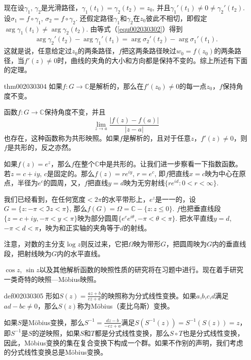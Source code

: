 现在设$\gamma_1$, $\gamma_2$是光滑路径，$\gamma_1(t_1) = \gamma_2(t_2) = z_0$, 并且$\gamma_1'(t_1) \neq 0 \neq \gamma_2'(t_2)$. 设$\sigma_1 = f \circ \gamma_1$, $\sigma_2 = f \circ \gamma_2$. 还假定路径$\gamma_1$和$\gamma_2$在$z_0$彼此不相切，即假定$\arg{\gamma_1(t_1)} \neq \arg{\gamma_2(t_2)}$. 由等式（\ref{equ002030302}）得到
\begin{gather}\label{equ002030303}
\arg{\gamma_2'(t_2)} - \arg{\gamma_1'(t_1)} = \arg{\sigma_2'(t_2)} - \arg{\sigma_1'(t_1)}.
\end{gather}
这就是说，任意给定过$z_0$的两条路径，$f$把这两条路径映过$w_0 = f(z_0)$的两条路径，当$f'(z) \neq 0$时，曲线的夹角的大小和方向都是保持不变的。综上所述有下面的定理。
\begin{theorem}{}{thm002030304}
如果$f:G \to \mathbb{C}$是解析的，那么在$f'(z_0) \neq 0$的每一点$z_0$，$f$保持角度不变。
\end{theorem}

函数$f: G \to \mathbb{C}$保持角度不变，并且
\[
\lim_{z \to a}{\frac{|f(z)-f(a)|}{|z-a|}}
\]
也存在，这种函数称为共形映照。如果$f$是解析的，且对于任意$z$，$f'(z) \neq 0$，则$f$是共形的，反之亦然。

如果$f(z) = e^z$，那么$f$在整个$\mathbb{C}$中是共形的。让我们进一步察看一下指数函数。若$z = c + iy$, $c$是固定的。那么$f(z) = re^{iy}$, $r=e^c$, 即$f$把直线$x=c$映为中心在原点，半径为$e^c$的圆周，又，$f$把直线$y=d$映为无穷射线$\{re^{id}: 0 < r < \infty\}$.

我们已经看到，在任何宽度$<2\pi$的水平带形上，$e^z$是一一的，设$G = \{z:-\pi < \Im{z} < \pi\}$, 那么$f(G) = \Omega = \mathbb{C} - \{z:z \le 0\}$. $f$也把垂直线段$\{z = c+iy, -\pi < y < \pi\}$映为部分圆周$\{e^ce^{i\theta}, -\pi < \theta < \pi\}$. 把水平直线$y = d$, $-\pi < d < \pi$，映为和正实轴的夹角等于$d$的射线。

注意，对数的主分支$\log{z}$则反过来，它把$\Omega$映为带形$G$，把圆周映为$G$内的垂直线段，把射线映为$G$内的水平直线。

$\cos{z}$, $\sin{z}$以及其他解析函数的映照性质的研究将在习题中进行。现在着手研究一类奇特的映照---M\"obius映照。
\begin{definition}{}{def002030305}
形如$S(z) = \frac{az+b}{cz+d}$的映照称为分式线性变换。如果$a$,$b$,$c$,$d$满足$ad-bc \neq 0$，那么$S(z)$称为M\"obius（麦比乌斯）变换。
\end{definition}

如果$S$是M\"obius变换，那么$S^{-1} = \frac{dz - b}{-cz+a}$满足$S(S^{-1}(z)) = S^{-1}(S(z)) = z$，即$S^{-1}$是$S$的逆映照，如果$S$和$T$都是分式线性变换，那么$S \circ T$也是分式线性变换，因此，M\"obius变换的集在复合变换下构成一个群。如果不作别的声明，我们考虑的分式线性变换总是M\"obius变换。

